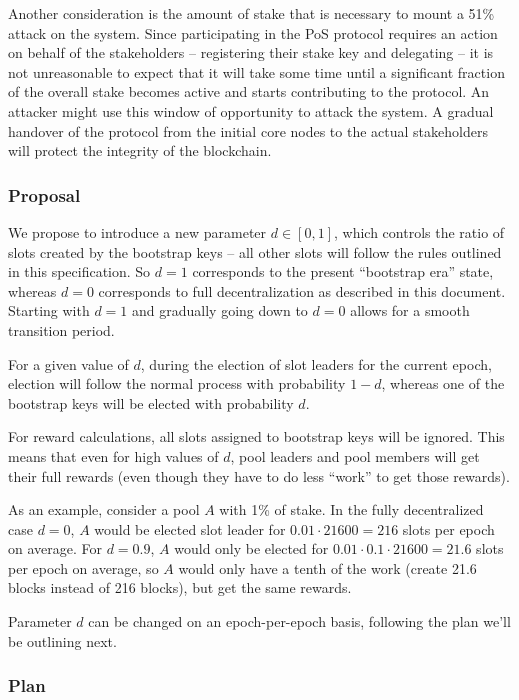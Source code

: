 \documentclass[11pt,a4paper]{article}
\begin{document}
Another consideration is the amount of stake that is necessary to mount
a 51\% attack on the system. Since participating in the PoS protocol
requires an action on behalf of the stakeholders -- registering their
stake key and delegating -- it is not unreasonable to expect that it
will take some time until a significant fraction of the overall stake
becomes active and starts contributing to the protocol. An attacker
might use this window of opportunity to attack the system. A gradual
handover of the protocol from the initial core nodes to the actual
stakeholders will protect the integrity of the blockchain.

\subsubsection{Proposal}
\label{proposal}

We propose to introduce a new parameter \(d\in[0,1]\), which controls
the ratio of slots created by the bootstrap keys -- all other slots will
follow the rules outlined in this specification. So \(d=1\) corresponds
to the present ``bootstrap era'' state, whereas \(d=0\) corresponds to
full decentralization as described in this document. Starting with
\(d=1\) and gradually going down to \(d=0\) allows for a smooth
transition period.

For a given value of \(d\), during the election of slot leaders for the
current epoch, election will follow the normal process with probability
\(1-d\), whereas one of the bootstrap keys will be elected with
probability \(d\).

For reward calculations, all slots assigned to bootstrap keys will be
ignored. This means that even for high values of \(d\), pool leaders and
pool members will get their full rewards (even though they have to do
less ``work'' to get those rewards).

As an example, consider a pool \(A\) with 1\% of stake. In the fully
decentralized case \(d=0\), \(A\) would be elected slot leader for
\(0.01\cdot 21600=216\) slots per epoch on average. For \(d=0.9\), \(A\)
would only be elected for \(0.01\cdot 0.1\cdot 21600=21.6\) slots per
epoch on average, so \(A\) would only have a tenth of the work (create
21.6 blocks instead of 216 blocks), but get the same rewards.

Parameter \(d\) can be changed on an epoch-per-epoch basis, following
the plan we'll be outlining next.

\subsubsection{Plan}
\label{plan}
\end{document}
